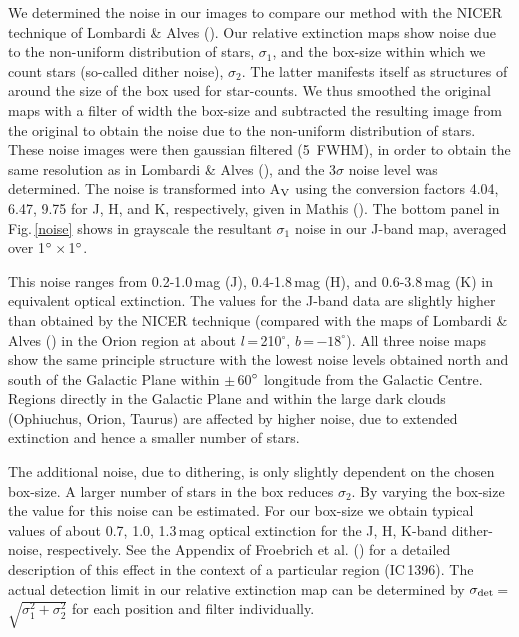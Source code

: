 \documentclass{aa}
\begin{document}
We determined the noise in our images to compare our method with the NICER
technique of Lombardi \& Alves (\cite{2001A&A...377.1023L}). Our relative
extinction maps show noise due to the non-uniform distribution of stars,
$\sigma_1$, and the box-size within which we count stars (so-called dither
noise), $\sigma_2$. The latter manifests itself as structures of around the
size of the box used for star-counts. We thus smoothed the original maps with a
filter of width the box-size and subtracted the resulting image from the
original to obtain the noise due to the non-uniform distribution of stars.
These noise images were then gaussian filtered (5\arcmin\, FWHM), in order to
obtain the same resolution as in Lombardi \& Alves
(\cite{2001A&A...377.1023L}), and the 3$\sigma$ noise level was determined. The
noise is transformed into A$_{\rm V}$ using the conversion factors 4.04, 6.47,
9.75 for J, H, and K, respectively, given in Mathis
(\cite{1990eism.conf...63M}). The bottom panel in Fig.\,\ref{noise} shows in
grayscale the resultant $\sigma_1$ noise in our J-band map, averaged over
1$\hbox{$^\circ$}$\,$\times$\,1$\hbox{$^\circ$}$. 

This noise ranges from 0.2-1.0\,mag (J), 0.4-1.8\,mag (H), and 0.6-3.8\,mag (K)
in equivalent optical extinction. The values for the J-band data are slightly
higher than obtained by the NICER technique (compared with the maps of Lombardi
\& Alves (\cite{2001A&A...377.1023L}) in the Orion region at about 
$l$\,=\,210$^\circ$, $b$\,=\,$-18^\circ$). All three noise maps show the same
principle structure with the lowest noise levels obtained north and south of
the Galactic Plane within $\pm$\,60$\hbox{$^\circ$}$ longitude from the Galactic Centre.
Regions directly in the Galactic Plane and within the large dark clouds
(Ophiuchus, Orion, Taurus) are affected by higher noise, due to extended
extinction and hence a smaller number of stars. 

The additional noise, due to dithering, is only slightly dependent on the
chosen box-size. A larger number of stars in the box reduces $\sigma_2$. By
varying the box-size the value for this noise can be estimated. For our
box-size we obtain typical values of about 0.7, 1.0, 1.3\,mag optical
extinction for the J, H, K-band dither-noise, respectively. See the Appendix of
Froebrich et al. (\cite{2005A&A.in.press.F}) for a detailed description of this
effect in the context of a particular region (IC\,1396). The actual detection
limit in our relative extinction map can be determined by $\sigma_{\rm
det}$\,=\,$\sqrt{\sigma_{1}^2 + \sigma_{2}^2}$ for each position and filter
individually.
\end{document}
